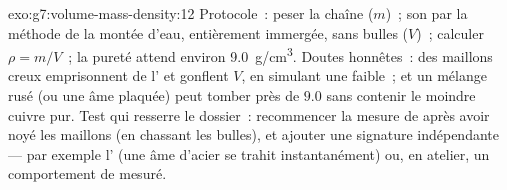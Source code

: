\begin{solution}{exo:g7:volume-mass-density:12}
Protocole~: peser la chaîne ($m$)~;  son  par la méthode
de la montée d'eau, entièrement immergée, sans bulles ($V$)~;
calculer $\rho = m/V$~; la pureté attend environ \qty{9.0}{g/cm^3}.
Doutes honnêtes~: des maillons creux emprisonnent de l' et
gonflent $V$, en simulant une  faible~; et un mélange
rusé (ou une âme plaquée) peut tomber près de $9.0$ sans contenir le
moindre cuivre pur. Test qui resserre le dossier~: recommencer la
mesure de  après avoir noyé les maillons (en chassant les
bulles), et ajouter une signature indépendante --- par exemple
l' (une âme d'acier se trahit instantanément) ou, en atelier,
un comportement de  mesuré.
\end{solution}

